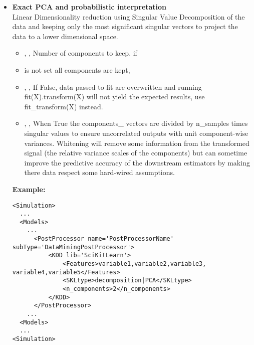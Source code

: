 \begin{itemize}
	\item \textbf{Exact PCA and probabilistic interpretation} \\
	Linear Dimensionality reduction using Singular Value Decomposition of
	the data and keeping only the most significant singular vectors to
	 project the data to a lower dimensional space.
	\begin{itemize}
		\item {}, , Number of components to keep. if
		\item {} is not set all components are kept,
		\item {}, , If False,
		 data passed to fit are overwritten and running fit(X).transform(X)
 		will not yield the expected results, use fit\_transform(X) instead.
		\item {}, , When True
		the components\_ vectors are divided by n\_samples times singular
		 values to ensure uncorrelated outputs with unit component-wise
		variances. Whitening will remove some information from the transformed
		 signal (the relative variance scales of the components) but can
		sometime improve the predictive accuracy of the downstream estimators
		 by making there data respect some hard-wired assumptions. 
	\end{itemize}
\textbf{Example:}
\begin{lstlisting}[style=XML,morekeywords={subType}]
<Simulation>
  ...
  <Models>
    ...
      <PostProcessor name='PostProcessorName' subType='DataMiningPostProcessor'>
          <KDD lib='SciKitLearn'>
              <Features>variable1,variable2,variable3, variable4,variable5</Features>
              <SKLtype>decomposition|PCA</SKLtype>
              <n_components>2</n_components>
          </KDD>
      </PostProcessor>
    ...
  <Models>
  ...
<Simulation>
\end{lstlisting}



\end{itemize}
